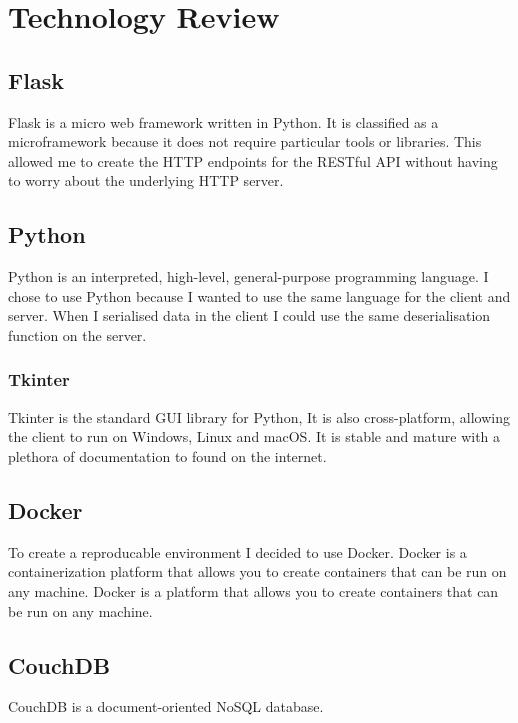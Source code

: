 \chapter{Technology Review}




\section{Flask}
Flask is a micro web framework written in Python.
It is classified as a microframework because it does not require particular tools or libraries.
This allowed me to create the HTTP endpoints for the RESTful API without having to worry about the underlying HTTP server.

\section{Python}
Python is an interpreted, high-level, general-purpose programming language.
I chose to use Python because I wanted to use the same language for the client and server.
When I serialised data in the client I could use the same deserialisation function on the server.

\subsection{Tkinter}
Tkinter is the standard GUI library for Python,
It is also cross-platform, allowing the client to run on Windows, Linux and macOS.
It is stable and mature with a plethora of documentation to found on the internet.

\section{Docker}
To create a reproducable environment I decided to use Docker.
Docker is a containerization platform that allows you to create containers that can be run on any machine.
Docker is a platform that allows you to create containers that can be run on any machine.

\section{CouchDB}
CouchDB is a document-oriented NoSQL database.

